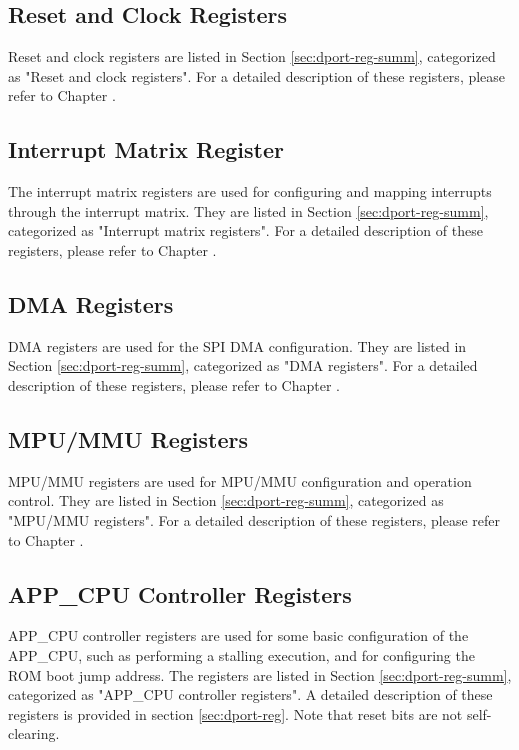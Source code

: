 \documentclass[main\_\_EN.tex]{subfiles}
\begin{document}
\subsection{Reset and Clock Registers}
Reset and clock registers are listed in Section \ref{sec:dport-reg-summ}, categorized as "Reset and clock registers". For a detailed description of these registers, please refer to Chapter \textit{}.


\subsection{Interrupt Matrix Register}
\label{sec:interrupt-matrix-register}
The interrupt matrix registers are used for configuring and mapping interrupts through the interrupt matrix. They are listed in Section \ref{sec:dport-reg-summ}, categorized as "Interrupt matrix registers". For a detailed description of these registers, please refer to Chapter \textit{}.


\subsection{DMA Registers}
DMA registers are used for the SPI DMA configuration. They are listed in Section \ref{sec:dport-reg-summ}, categorized as "DMA registers". For a detailed description of these registers, please refer to Chapter \textit{}.


\subsection{MPU/MMU Registers}
MPU/MMU registers are used for MPU/MMU configuration and operation control. They are listed in Section \ref{sec:dport-reg-summ}, categorized as "MPU/MMU registers". For a detailed description of these registers, please refer to Chapter \textit{}.


\subsection{APP\_CPU Controller Registers}

APP\_CPU controller registers are used for some basic configuration of the APP\_CPU, such as performing a stalling execution, and for configuring the ROM boot jump address. The registers are listed in Section \ref{sec:dport-reg-summ}, categorized as "APP\_CPU controller registers". A detailed description of these registers is provided in section \ref{sec:dport-reg}. Note that reset bits are not self-clearing.
\end{document}
